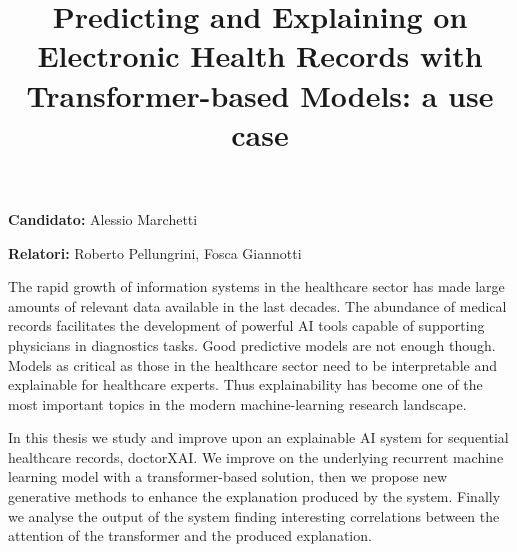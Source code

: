 \documentclass[]{marticle}
\title{\vspace{-2cm}\textbf{\huge Predicting and Explaining on Electronic Health Records  with Transformer-based Models: a use case}}
\date{}
\author{}
\begin{document}
\maketitle


\textbf{Candidato:} Alessio Marchetti

\textbf{Relatori:} Roberto Pellungrini, Fosca Giannotti
\vspace{0.5cm}

The rapid growth of information systems in the healthcare sector has made large amounts of relevant
data available in the last decades. The abundance of medical records facilitates the development of
powerful AI tools capable of supporting physicians in diagnostics tasks. Good predictive models are
not enough though. Models as critical as those in the healthcare sector need to be interpretable and
explainable for healthcare experts. Thus explainability has become one of the most important topics
in the modern machine-learning research landscape.

In this thesis we study and improve upon an explainable AI system for sequential healthcare records,
doctorXAI. We improve on the underlying recurrent machine learning model with a transformer-based
solution, then we propose new generative methods to enhance the explanation produced by the system.
Finally we analyse the output of the system finding interesting correlations between the attention
of the transformer and the produced explanation.
\end{document}
